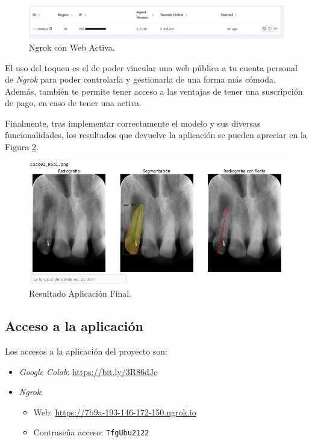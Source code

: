 \begin{figure}[h]
    \centering
    \includegraphics[scale=0.5]{./img/WebOnline.png}
    \caption{Ngrok con Web Activa.}
    \label{web}
\end{figure}

El uso del toquen es el de poder vincular una web pública a tu cuenta personal de \emph{Ngrok} para poder controlarla y gestionarla de una forma más cómoda. Además, también te permite tener acceso a las ventajas de tener una suscripción de pago, en caso de tener una activa.

Finalmente, tras implementar correctamente el modelo y sus diversas funcionalidades, los resultados que devuelve la aplicación se pueden apreciar en la Figura \ref{apli}.

\begin{figure}[h]
    \centering
    \includegraphics[scale=0.7]{./img/ResultadoApl.png}
    \caption{Resultado Aplicación Final.}
    \label{apli}
\end{figure}

\subsection{Acceso a la aplicación}
Los accesos a la aplicación del proyecto son:
\begin{itemize}
    \item \emph{Google Colab}:  \url{https://bit.ly/3R86dJc}
    \item \emph{Ngrok}:
    \begin{itemize}
        \item Web: \url{https://7b9a-193-146-172-150.ngrok.io}
        \item Contraseña acceso: \texttt{TfgUbu2122} 
    \end{itemize}
\end{itemize}
